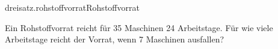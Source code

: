 \begin{exercise}{dreisatz.rohstoffvorrat}{Rohstoffvorrat}
  \ifproblem\problem\par
    Ein Rohstoffvorrat reicht für 35 Maschinen 24 Arbeitstage. Für wie viele
    Arbeitstage reicht der Vorrat, wenn 7 Maschinen ausfallen?
  \fi
\end{exercise}
